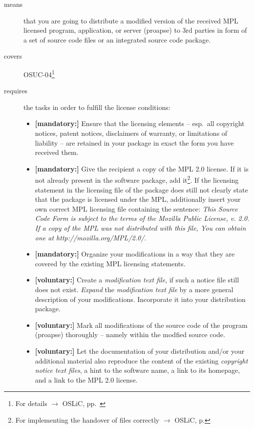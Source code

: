 \begin{description}
\item[means] that you are going to distribute a modified version of the received
MPL licensed program, application, or server (proapse) to 3rd parties in form
of a set of source code files or an integrated source code package.
\item[covers] OSUC-04\footnote{For details $\rightarrow$ OSLiC, pp.\ \pageref{OSUC-04-DEF}}
\item[requires] the tasks in order to fulfill the license conditions:
\begin{itemize}
  
  \item \textbf{[mandatory:]} Ensure that the licensing elements -- esp.\ all
  copyright notices, patent notices, disclaimers of warranty, or limitations of
  liability -- are retained in your package in exact the form you have received
  them.

  \item \textbf{[mandatory:]} Give the recipient a copy of the MPL 2.0 license.
  If it is not already present in the software package, add it\footnote{For
  implementing the handover of files correctly $\rightarrow$ OSLiC, p.
  \pageref{DistributingFilesHint}}. If the licensing statement in the licensing
  file of the package does still not clearly state that the package is licensed
  under the MPL, additionally insert your own correct MPL licensing file
  containing the sentence: \emph{This Source Code Form is subject to the terms
  of the Mozilla Public License, v. 2.0. If a copy of the MPL was not
  distributed with this file, You can obtain one at
  http://mozilla.org/MPL/2.0/}.  
  
  \item \textbf{[mandatory:]} Organize your modifications in a way that they are
  covered by the existing MPL licensing statements.
  
  \item \textbf{[voluntary:]} Create a \emph{modification text file}, if such a
  notice file still does not exist. \emph{Expand} the \emph{modification text
  file} by a more general description of your modifications. Incorporate it into
  your distribution package.
  
  \item \textbf{[voluntary:]} Mark all modifications of the source code of the
  program (proapse) thoroughly -- namely within the modfied source code.

  \item \textbf{[voluntary:]} Let the documentation of your distribution and/or
  your additional material also reproduce the content of the existing
  \emph{copyright notice text files}, a hint to the software name, a link to its
  homepage, and a link to the MPL 2.0 license.
  

\end{itemize}
\end{description}
